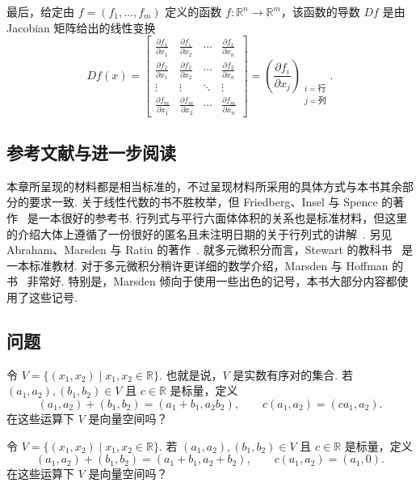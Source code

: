最后，给定由 $f=(f_1,\ldots,f_m)$ 定义的函数 $f:\mathbb{R}^n\to\mathbb{R}^m$，该函数的导数 $Df$ 是由 Jacobian 矩阵给出的线性变换
\[
Df(x)=\begin{bmatrix}
\frac{\partial f_1}{\partial x_1}&\frac{\partial f_1}{\partial x_2}&\cdots&\frac{\partial f_1}{\partial x_n}\\[2mm]
\frac{\partial f_2}{\partial x_1}&\frac{\partial f_2}{\partial x_2}&\cdots&\frac{\partial f_2}{\partial x_n}\\
\vdots&\vdots&\ddots&\vdots\\
\frac{\partial f_m}{\partial x_1}&\frac{\partial f_m}{\partial x_2}&\cdots&\frac{\partial f_m}{\partial x_n}
\end{bmatrix}
=\left(\frac{\partial f_i}{\partial x_j}\right)_{\substack{i=\text{行}\\j=\text{列}}}.
\]

\subsection{参考文献与进一步阅读}

本章所呈现的材料都是相当标准的，不过呈现材料所采用的具体方式与本书其余部分的要求一致. 关于线性代数的书不胜枚举，但 Friedberg、Insel 与 Spence 的著作~\cite{ref22} 是一本很好的参考书. 行列式与平行六面体体积的关系也是标准材料，但这里的介绍大体上遵循了一份很好的匿名且未注明日期的关于行列式的讲解~\cite{ref02}. 另见 Abraham、Marsden 与 Ratiu 的著作~\cite{ref01}. 就多元微积分而言，Stewart 的教科书~\cite{ref43} 是一本标准教材. 对于多元微积分稍许更详细的数学介绍，Marsden 与 Hoffman 的书~\cite{ref31} 非常好. 特别是，Marsden 倾向于使用一些出色的记号，本书大部分内容都使用了这些记号.

\subsection{问题}

\begin{question}\label{q:1-18}
令 $V=\{(x_1,x_2)\mid x_1,x_2\in\mathbb{R}\}$. 也就是说，$V$ 是实数有序对的集合. 若 $(a_1,a_2),(b_1,b_2)\in V$ 且 $c\in\mathbb{R}$ 是标量，定义
\[
(a_1,a_2)+(b_1,b_2)=(a_1+b_1,a_2b_2),\qquad c(a_1,a_2)=(ca_1,a_2).
\]
在这些运算下 $V$ 是向量空间吗？
\end{question}

\begin{question}\label{q:1-19}
令 $V=\{(x_1,x_2)\mid x_1,x_2\in\mathbb{R}\}$. 若 $(a_1,a_2),(b_1,b_2)\in V$ 且 $c\in\mathbb{R}$ 是标量，定义
\[
(a_1,a_2)+(b_1,b_2)=(a_1+b_1,a_2+b_2),\qquad c(a_1,a_2)=(a_1,0).
\]
在这些运算下 $V$ 是向量空间吗？
\end{question}

